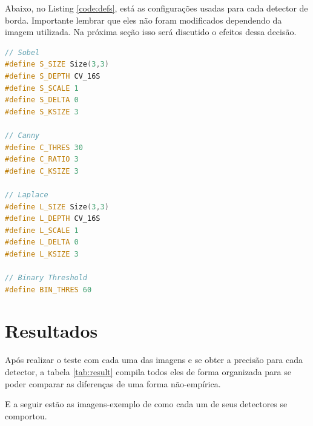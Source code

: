 \documentclass[10pt,twocolumn,letterpaper]{article}
\begin{document}
Abaixo, no Listing \ref{code:defs}, está as configurações usadas para cada detector de borda. Importante lembrar que eles não foram modificados dependendo da imagem utilizada. Na próxima seção isso será discutido o efeitos dessa decisão.

\begin{lstlisting}[language=C++, caption={Parâmetros passados para os detectores}, label={code:defs}]
// Sobel
#define S_SIZE Size(3,3)
#define S_DEPTH CV_16S
#define S_SCALE 1
#define S_DELTA 0
#define S_KSIZE 3

// Canny
#define C_THRES 30
#define C_RATIO 3
#define C_KSIZE 3

// Laplace
#define L_SIZE Size(3,3)
#define L_DEPTH CV_16S
#define L_SCALE 1
#define L_DELTA 0
#define L_KSIZE 3

// Binary Threshold
#define BIN_THRES 60
\end{lstlisting}

\section{Resultados}
Após realizar o teste com cada uma das imagens e se obter a precisão para cada detector, a tabela \ref{tab:result} compila todos eles de forma organizada para se poder comparar as diferenças de uma forma não-empírica.

\begin{table}[!htp]
\centering
{}
\caption{Precisão obtida com cada detector por imagem}
\label{tab:result}
\end{table}

E a seguir estão as imagens-exemplo de como cada um de seus detectores se comportou.
\end{document}
